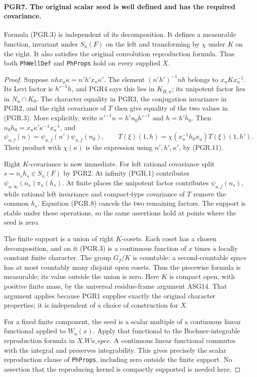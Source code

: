 \documentclass[11pt,a4paper]{article}
\numberwithin{equation}{section}
\theoremstyle{remark}\newtheorem{remark}[theorem]{Remark}
\begin{document}
\paragraph{PGR7. The original scalar seed is well defined and has the required covariance.}
\label{claim:PGR7}
Formula (PGR.3) is independent of its decomposition.  It defines a
measurable function, invariant under \(S_u(F)\) on the left and
transforming by \(\chi\) under \(K\) on the right.  It also
satisfies the original convolution reproduction formula.  Thus both
\texttt{Ph\allowbreak Well\allowbreak Def} and \texttt{Ph\allowbreak Props} hold on every supplied \(X\).
\begin{proof}
Suppose \(nhx_u\kappa=n'h'x_u\kappa'\).  The element
\((n'h')^{-1}nh\) belongs to \(x_uKx_u^{-1}\).
Its Levi factor is \(h'^{-1}h\), and PGR4 says this lies in
\(K_{H,u}\); its unipotent factor lies in \(N_u\cap K_0\).
The character equality in PGR3, the conjugation invariance in PGR2,
and the right covariance of \(T\) then give equality of the two
values in (PGR.3).  More explicitly, write
\(n'^{-1}n=h' n_0 h'^{-1}\) and \(h=h'h_0\).  Then
\(n_0h_0=x_u\kappa'\kappa^{-1}x_u^{-1}\), and
\[
 \psi_{u,f}(n)=\psi_{u,f}(n')\psi_{u,f}(n_0),\qquad
 T(\xi)(1,h)=\chi(x_u^{-1}h_0x_u)T(\xi)(1,h').
\]
Their product with \(\chi(\kappa)\) is the expression using
\(n',h',\kappa'\), by (PGR.11).

Right \(K\)-covariance is now immediate.  For left rational
covariance split \(s=n_sh_s\in S_u(F)\) by PGR2.
At infinity (PGR.1) contributes
\(\psi_{u,\infty}(n_s)\pi_u(h_s)\).  At finite places the
unipotent factor contributes \(\psi_{u,f}(n_s)\), while
rational left invariance and compact-type covariance of \(T\)
remove the common \(h_s\).  Equation (PGR.8) cancels the two
remaining factors.  The support is stable under these operations,
so the same assertions hold at points where the seed is zero.

The finite support is a union of right \(K\)-cosets.  Each coset
has a chosen decomposition, and on it (PGR.3) is a continuous
function of \(x\) times a locally constant finite character.
The group \(G_f/K\) is countable: a second-countable space has
at most countably many disjoint open cosets.  Thus the piecewise
formula is measurable; its value outside the union is zero.
Here \(K\) is compact open, with positive finite mass, by the
universal residue-frame argument ASG14.  That argument applies
because PGR1 supplies exactly the original character properties;
it is independent of a choice of construction for \(X\).

For a fixed finite component, the seed is a scalar multiple of a
continuous linear functional applied to \(W_u(x)\).
Apply that functional to the Bochner-integrable reproduction formula
in \(X.Wu\_\allowbreak spec\).  A continuous linear functional commutes with
the integral and preserves integrability.  This gives precisely the
scalar reproduction clause of \texttt{Ph\allowbreak Props}, including zero
outside the finite support.  No assertion that the reproducing
kernel is compactly supported is needed here.
\end{proof}
\end{document}
